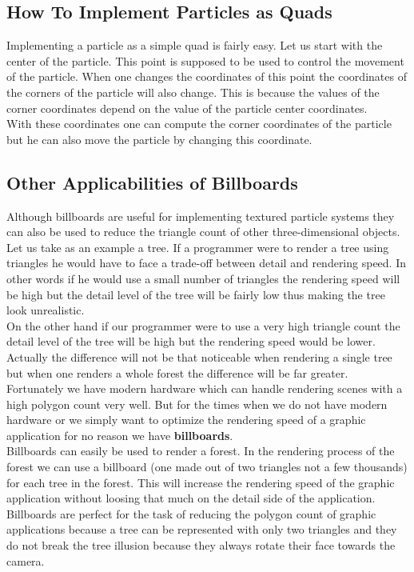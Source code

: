 \newpage
\subsection{How To Implement Particles as Quads}
Implementing a particle as a simple quad is fairly easy. Let us start with the center of the particle. This point is supposed to be used to control the movement of the particle. When one changes the coordinates of this point the coordinates of the corners of the particle will also change. This is because the values of the corner coordinates depend on the value of the particle center coordinates.\\

With these coordinates one can compute the corner coordinates of the particle but he can also move the particle by changing this coordinate.\\


\newpage
\subsection{Other Applicabilities of Billboards}
Although billboards are useful for implementing textured particle systems they can also be used to reduce the triangle count of other three-dimensional objects.\\

Let us take as an example a tree. If a programmer were to render a tree using triangles he would have to face a trade-off between detail and rendering speed. In other words if he would use a small number of triangles the rendering speed will be high but the detail level of the tree will be fairly low thus making the tree look unrealistic.\\

On the other hand if our programmer were to use a very high triangle count the detail level of the tree will be high but the rendering speed would be lower. Actually the difference will not be that noticeable when rendering a single tree but when one renders a whole forest the difference will be far greater.\\

Fortunately we have modern hardware which can handle rendering scenes with a high polygon count very well. But for the times when we do not have modern hardware or we simply want to optimize the rendering speed of a graphic application for no reason we have \textbf{billboards}.\\

Billboards can easily be used to render a forest. In the rendering process of the forest we can use a billboard (one made out of two triangles not a few thousands) for each tree in the forest. This will increase the rendering speed of the graphic application without loosing that much on the detail side of the application.\\

Billboards are perfect for the task of reducing the polygon count of graphic applications because a tree can be represented with only two triangles and they do not break the tree illusion because they always rotate their face towards the camera.\\